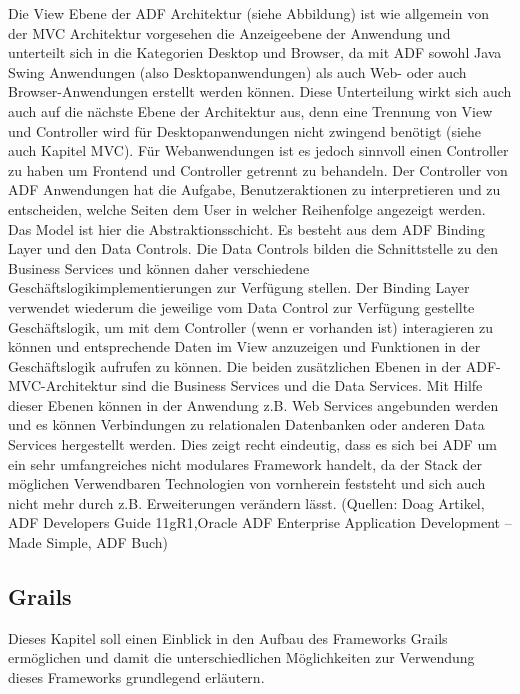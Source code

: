Die View Ebene der ADF Architektur (siehe Abbildung) ist wie allgemein von der MVC Architektur vorgesehen die Anzeigeebene der Anwendung und unterteilt sich in die Kategorien Desktop und Browser, da mit ADF sowohl Java Swing Anwendungen (also Desktopanwendungen) als auch Web- oder auch Browser-Anwendungen erstellt werden können. Diese Unterteilung wirkt sich auch auch auf die nächste Ebene der Architektur aus, denn eine Trennung von View und Controller wird für Desktopanwendungen nicht zwingend benötigt (siehe auch Kapitel MVC). Für Webanwendungen ist es jedoch sinnvoll einen Controller zu haben um Frontend und Controller getrennt zu behandeln. Der Controller von ADF Anwendungen hat die Aufgabe, Benutzeraktionen zu interpretieren und zu entscheiden, welche Seiten dem User in welcher Reihenfolge angezeigt werden.\\
Das Model ist hier die Abstraktionsschicht. Es besteht aus dem ADF Binding Layer und den Data Controls. Die Data Controls bilden die Schnittstelle zu den Business Services und können daher verschiedene Geschäftslogikimplementierungen zur Verfügung stellen. Der Binding Layer verwendet wiederum die jeweilige vom Data Control zur Verfügung gestellte Geschäftslogik, um mit dem Controller (wenn er vorhanden ist) interagieren zu können und entsprechende Daten im View anzuzeigen und Funktionen in der Geschäftslogik aufrufen zu können.
Die beiden zusätzlichen Ebenen in der ADF-MVC-Architektur sind die Business Services und die Data Services. Mit Hilfe dieser Ebenen können in der Anwendung z.B. Web Services angebunden werden und es können Verbindungen zu relationalen Datenbanken oder anderen Data Services hergestellt werden. Dies zeigt recht eindeutig, dass es sich bei ADF um ein sehr umfangreiches nicht modulares Framework handelt, da der Stack der möglichen Verwendbaren Technologien von vornherein feststeht und sich auch nicht mehr durch z.B. Erweiterungen verändern lässt.
(Quellen: Doag Artikel, ADF Developers Guide 11gR1,Oracle ADF Enterprise Application Development – Made Simple, ADF Buch)

\subsection{Grails}
Dieses Kapitel soll einen Einblick in den Aufbau des Frameworks Grails ermöglichen und damit die unterschiedlichen Möglichkeiten zur Verwendung dieses Frameworks grundlegend erläutern.

